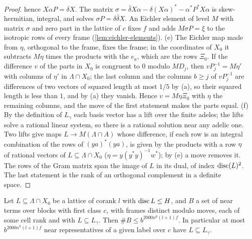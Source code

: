 \begin{proof}
hence $X\alpha P=\delta X$. The matrix $\sigma=\bar\delta X\alpha-\delta(X\alpha)^*-\alpha^*P^*X\alpha$ is skew-hermitian, integral, and solves $\sigma P=\delta\bar\delta X$. An Eichler element of level $M$ with matrix $\sigma$ and zero part in the lattice of
$c$ fixes $f$ and adds $M\sigma P=\xi$ to the isotropic rows of every frame (\cref{lem:eichler-elements}).
(e) The Eichler map made from $\eta$, orthogonal to the frame, fixes the frame; in the coordinates of $X_0$ it subtracts $M\eta$ times the products with the $e_a$, which are the rows $\Xi_0$. If the difference $v$ of the parts in
$X_0$ is congruent to $0$ modulo $MD_j$, then $vP_j^{-1}=M\eta'$ with columns of $\eta'$ in $\Lambda\cap X_0$; the last column and the columns $b\ge j$ of $vP_j^{-1}$ are differences of two vectors of squared length at most $1/5$ by
(a), so their squared length is less than $1$, and by (a) they vanish. Hence $v=M\eta\Xi_0$ with $\eta$ the remaining columns, and the move of the first statement makes the parts equal.
(f) By the definition of $L_\gamma$ each basis vector has a lift over the finite adeles; the lifts solve a rational linear system, so there is a rational solution near any adelic one. Two lifts give maps $L\to M(\Lambda\cap A)$
whose difference, if each row is an integral combination of the rows of $(ya)^*(ya)$, is given by the products with a row $\eta$ of rational vectors of $L\subseteq\Lambda\cap X_0$ ($\eta=y(y^*y)^{-1}w^*$); by (e) a move
removes it. The rows of the Gram matrix span the image of $L$ in its dual, of index $\operatorname{disc}(L)^2$. The last statement is the rank of an orthogonal complement in a definite space.
\end{proof}

\begin{proposition}\label{prop:frames-over-lattice}
Let $L\subseteq\Lambda\cap X_0$ be a lattice of corank $l$ with $\operatorname{disc} L\le H$, and $B$ a set of near terms over blocks with first class $c$, with frames distinct modulo moves, each of some cell rank and with $L\subseteq L_\gamma$.
Then $\#B\le b^{2000n^6(l+1)f}$. In particular at most $b^{2000n^6(l+1)f}$ near representatives of a given label over $c$ have $L\subseteq L_\gamma$.
\end{proposition}

